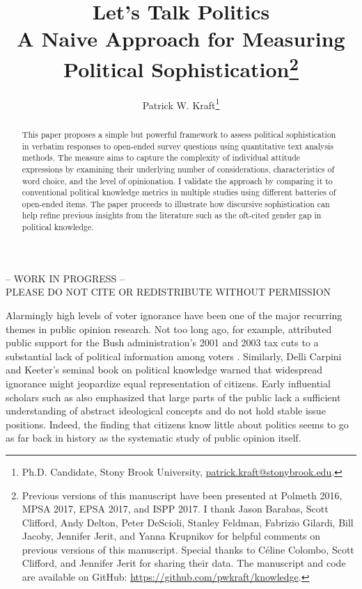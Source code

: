 \documentclass[12pt]{article}
\author{Patrick W. Kraft\footnote{Ph.D. Candidate, Stony Brook University, \href{mailto:patrick.kraft@stonybrook.edu}{patrick.kraft@stonybrook.edu}.
}}
\title{Let's Talk Politics\\
\large{A Naive Approach for Measuring Political Sophistication}\footnote{Previous versions of this manuscript have been presented at Polmeth 2016, MPSA 2017, EPSA 2017, and ISPP 2017.
I thank Jason Barabas, Scott Clifford, Andy Delton, Peter DeScioli, Stanley Feldman, Fabrizio Gilardi, Bill Jacoby, Jennifer Jerit, and Yanna Krupnikov for helpful comments on previous versions of this manuscript. Special thanks to C{\'e}line Colombo, Scott Clifford, and Jennifer Jerit for sharing their data. The manuscript and code are available on GitHub: \url{https://github.com/pwkraft/knowledge}.
}
}
\date{}
\begin{document}
\maketitle
\doublespacing
\thispagestyle{empty}

\begin{center}
-- WORK IN PROGRESS -- \\
PLEASE DO NOT CITE OR REDISTRIBUTE WITHOUT PERMISSION
\end{center} 

\hfill
\begin{abstract}\singlespacing
This paper proposes a simple but powerful framework to assess political sophistication in verbatim responses to open-ended survey questions using quantitative text analysis methods. The measure aims to capture the complexity of individual attitude expressions by examining their underlying number of considerations, characteristics of word choice, and the level of opinionation. I validate the approach by comparing it to conventional political knowledge metrics in multiple studies using different batteries of open-ended items. The paper proceeds to illustrate how discursive sophistication can help refine previous insights from the literature such as the oft-cited gender gap in political knowledge.


\end{abstract}
\hfill
\newpage\setcounter{page}{1}

Alarmingly high levels of voter ignorance have been one of the major recurring themes in public opinion research. Not too long ago, for example, \citet{bartels2005homer} attributed public support for the Bush administration's 2001 and 2003 tax cuts to a substantial lack of political information among voters \citep[but see][]{lupia2007were,bartels2007homer}. Similarly, Delli Carpini and Keeter's \citeyearpar{carpini1996americans} seminal book on political knowledge warned that widespread ignorance might jeopardize equal representation of citizens. Early influential scholars such as \citet{converse1964nature} also emphasized that large parts of the public lack a sufficient understanding of abstract ideological concepts and do not hold stable issue positions. Indeed, the finding that citizens know little about politics seems to go as far back in history as the systematic study of public opinion itself.
\end{document}

